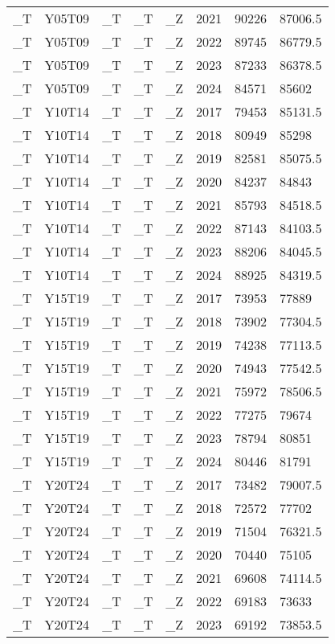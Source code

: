 \begin{longtable}[t]{llllllll}
\_T & Y05T09 & \_T & \_T & \_Z & 2021 & 90226 & 87006.5\\
\_T & Y05T09 & \_T & \_T & \_Z & 2022 & 89745 & 86779.5\\
\_T & Y05T09 & \_T & \_T & \_Z & 2023 & 87233 & 86378.5\\
\addlinespace
\_T & Y05T09 & \_T & \_T & \_Z & 2024 & 84571 & 85602\\
\_T & Y10T14 & \_T & \_T & \_Z & 2017 & 79453 & 85131.5\\
\_T & Y10T14 & \_T & \_T & \_Z & 2018 & 80949 & 85298\\
\_T & Y10T14 & \_T & \_T & \_Z & 2019 & 82581 & 85075.5\\
\_T & Y10T14 & \_T & \_T & \_Z & 2020 & 84237 & 84843\\
\addlinespace
\_T & Y10T14 & \_T & \_T & \_Z & 2021 & 85793 & 84518.5\\
\_T & Y10T14 & \_T & \_T & \_Z & 2022 & 87143 & 84103.5\\
\_T & Y10T14 & \_T & \_T & \_Z & 2023 & 88206 & 84045.5\\
\_T & Y10T14 & \_T & \_T & \_Z & 2024 & 88925 & 84319.5\\
\_T & Y15T19 & \_T & \_T & \_Z & 2017 & 73953 & 77889\\
\addlinespace
\_T & Y15T19 & \_T & \_T & \_Z & 2018 & 73902 & 77304.5\\
\_T & Y15T19 & \_T & \_T & \_Z & 2019 & 74238 & 77113.5\\
\_T & Y15T19 & \_T & \_T & \_Z & 2020 & 74943 & 77542.5\\
\_T & Y15T19 & \_T & \_T & \_Z & 2021 & 75972 & 78506.5\\
\_T & Y15T19 & \_T & \_T & \_Z & 2022 & 77275 & 79674\\
\addlinespace
\_T & Y15T19 & \_T & \_T & \_Z & 2023 & 78794 & 80851\\
\_T & Y15T19 & \_T & \_T & \_Z & 2024 & 80446 & 81791\\
\_T & Y20T24 & \_T & \_T & \_Z & 2017 & 73482 & 79007.5\\
\_T & Y20T24 & \_T & \_T & \_Z & 2018 & 72572 & 77702\\
\_T & Y20T24 & \_T & \_T & \_Z & 2019 & 71504 & 76321.5\\
\addlinespace
\_T & Y20T24 & \_T & \_T & \_Z & 2020 & 70440 & 75105\\
\_T & Y20T24 & \_T & \_T & \_Z & 2021 & 69608 & 74114.5\\
\_T & Y20T24 & \_T & \_T & \_Z & 2022 & 69183 & 73633\\
\_T & Y20T24 & \_T & \_T & \_Z & 2023 & 69192 & 73853.5\\

\end{longtable}
